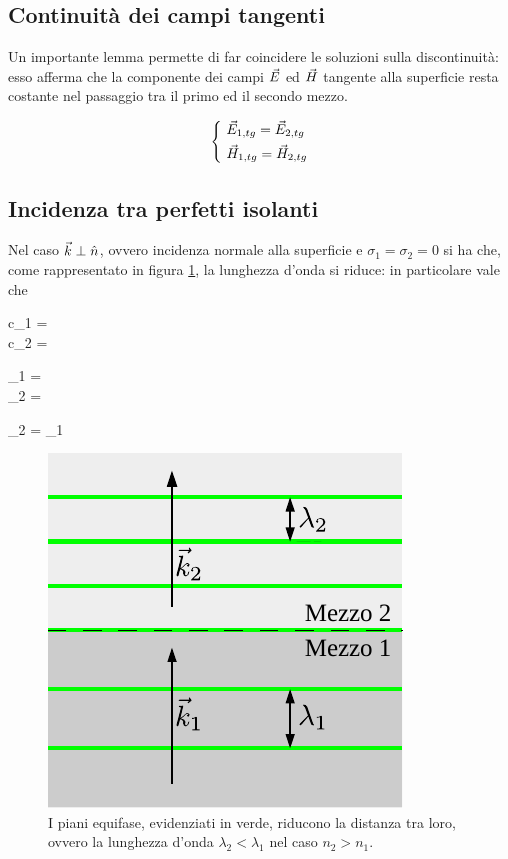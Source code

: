 \subsection{Continuità dei campi tangenti}
Un importante lemma permette di far coincidere le soluzioni sulla discontinuità: esso afferma che la componente dei campi $\vec{E}$ ed $\vec{H}$ tangente alla superficie resta costante nel passaggio tra il primo ed il secondo mezzo.

\begin{equation}
	\begin{dcases}
		~ \vec{E}_{1, tg} = \vec{E}_{2, tg} \\
		~ \vec{H}_{1, tg} = \vec{H}_{2, tg}
	\end{dcases}
\end{equation}

\subsection{Incidenza tra perfetti isolanti}
	Nel caso $\vec{k} \perp \hat{n}$, ovvero incidenza normale alla superficie e $\sigma_1 = \sigma_2 = 0$ si ha che, come rappresentato in figura \ref{fig:incidenza_normale_isolanti}, la lunghezza d'onda si riduce: in particolare vale che

	\begin{esp}
		\begin{dcases}
			c_1 =  \\
			c_2 = 
		\end{dcases}
		\implies
		\begin{dcases}
			\lambda_1 = \frac{\lambda_o}{n_1} \\
			\lambda_2 = \frac{\lambda_o}{n_2}
		\end{dcases}
		\implies
		\lambda_2 = \lambda_1 
	\end{esp}

	\begin{figure}[ht]
		\centering
		\includegraphics{img/incidenza_normale.pdf}
		\caption{I piani equifase, evidenziati in verde, riducono la distanza tra loro, ovvero la lunghezza d'onda $\lambda_2 < \lambda_1$ nel caso $n_2 > n_1$.}
		\label{fig:incidenza_normale_isolanti}
	\end{figure}

